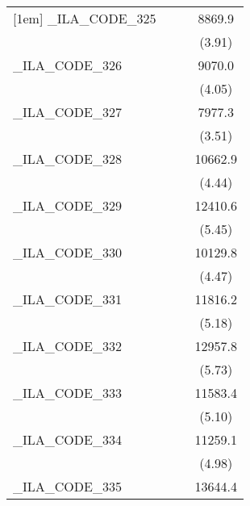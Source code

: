 {\begin{tabular}{l*{3}{c}}
[1em]
\_ILA\_CODE\_325&                     &                     &      8869.9\sym{***}\\
            &                     &                     &      (3.91)         \\
[1em]
\_ILA\_CODE\_326&                     &                     &      9070.0\sym{***}\\
            &                     &                     &      (4.05)         \\
[1em]
\_ILA\_CODE\_327&                     &                     &      7977.3\sym{***}\\
            &                     &                     &      (3.51)         \\
[1em]
\_ILA\_CODE\_328&                     &                     &     10662.9\sym{***}\\
            &                     &                     &      (4.44)         \\
[1em]
\_ILA\_CODE\_329&                     &                     &     12410.6\sym{***}\\
            &                     &                     &      (5.45)         \\
[1em]
\_ILA\_CODE\_330&                     &                     &     10129.8\sym{***}\\
            &                     &                     &      (4.47)         \\
[1em]
\_ILA\_CODE\_331&                     &                     &     11816.2\sym{***}\\
            &                     &                     &      (5.18)         \\
[1em]
\_ILA\_CODE\_332&                     &                     &     12957.8\sym{***}\\
            &                     &                     &      (5.73)         \\
[1em]
\_ILA\_CODE\_333&                     &                     &     11583.4\sym{***}\\
            &                     &                     &      (5.10)         \\
[1em]
\_ILA\_CODE\_334&                     &                     &     11259.1\sym{***}\\
            &                     &                     &      (4.98)         \\
[1em]
\_ILA\_CODE\_335&                     &                     &     13644.4\sym{***}\\

\end{tabular}}
